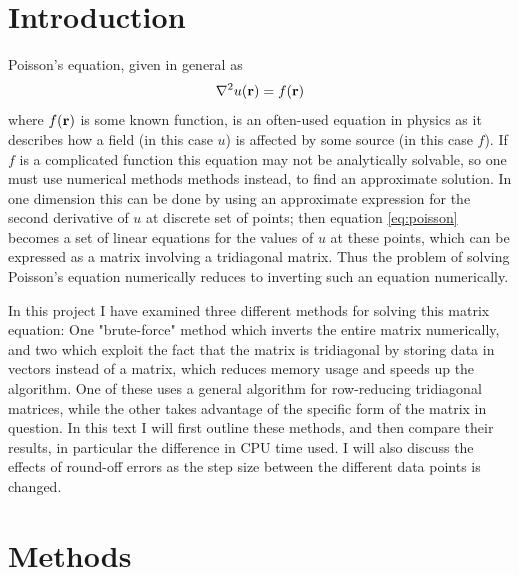 \documentclass[a4paper,english]{article}
\renewcommand\vec{\mathbf}
\let\originalleft\left
\let\originalright\right
\renewcommand{\left}{\mathopen{}\mathclose\bgroup\originalleft}
\renewcommand{\right}{\aftergroup\egroup\originalright}
\begin{document}
\section{Introduction}
Poisson's equation, given in general as
\begin{equation}
  \nabla^2 u\left(\vec{r}\right) = f\left(\vec{r}\right)
  \label{eq:poisson}
\end{equation}
where $f\left(\vec{r}\right)$ is some known function, is an often-used equation in physics as it describes how a field (in this case $u$) is affected by some source (in this case $f$). If $f$ is a complicated function this equation may not be analytically solvable, so one must use numerical methods methods instead, to find an approximate solution. In one dimension this can be done by using an approximate expression for the second derivative of $u$ at discrete set of points; then equation \ref{eq:poisson} becomes a set of linear equations for the values of $u$ at these points, which can be expressed as a matrix involving a tridiagonal matrix. Thus the problem of solving Poisson's equation numerically reduces to inverting such an equation numerically. \par
In this project I have examined three different methods for solving this matrix equation: One "brute-force" method which inverts the entire matrix numerically, and two which exploit the fact that the matrix is tridiagonal by storing data in vectors instead of a matrix, which reduces memory usage and speeds up the algorithm. One of these uses a general algorithm for row-reducing tridiagonal matrices, while the other takes advantage of the specific form of the matrix in question. In this text I will first outline these methods, and then compare their results, in particular the difference in CPU time used. I will also discuss the effects of round-off errors as the step size between the different data points is changed.
\section{Methods}
\end{document}
